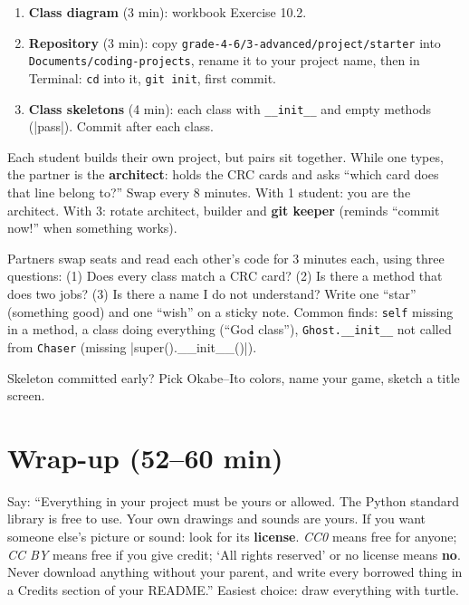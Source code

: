 \begin{enumerate}[itemsep=2pt]
  \item \textbf{Class diagram} (3 min): workbook Exercise 10.2.
  \item \textbf{Repository} (3 min): copy \texttt{grade-4-6/3-advanced/project/starter} into \texttt{Documents/coding-projects}, rename it to your project name, then in Terminal: \texttt{cd} into it, \texttt{git init}, first commit.
  \item \textbf{Class skeletons} (4 min): each class with \texttt{\_\_init\_\_} and empty methods (\py|pass|). Commit after each class.
\end{enumerate}

\begin{pairroles}
Each student builds their own project, but pairs sit together. While one types, the partner is the \textbf{architect}: holds the CRC cards and asks \enquote{which card does that line belong to?} Swap every 8 minutes. With 1 student: you are the architect. With 3: rotate architect, builder and \textbf{git keeper} (reminds \enquote{commit now!} when something works).
\end{pairroles}

\begin{bughunt}
Partners swap seats and read each other's code for 3 minutes each, using three questions: (1) Does every class match a CRC card? (2) Is there a method that does two jobs? (3) Is there a name I do not understand? Write one \enquote{star} (something good) and one \enquote{wish} on a sticky note. Common finds: \texttt{self} missing in a method, a class doing everything (\enquote{God class}), \texttt{Ghost.\_\_init\_\_} not called from \texttt{Chaser} (missing \py|super().__init__()|).
\end{bughunt}

\begin{freebuild}
Skeleton committed early? Pick Okabe--Ito colors, name your game, sketch a title screen.
\end{freebuild}

\section{Wrap-up (52--60 min)}
\begin{safety}
Say: \enquote{Everything in your project must be yours or allowed. The Python standard library is free to use. Your own drawings and sounds are yours. If you want someone else's picture or sound: look for its \textbf{license}. \emph{CC0} means free for anyone; \emph{CC BY} means free if you give credit; \enquote{All rights reserved} or no license means \textbf{no}. Never download anything without your parent, and write every borrowed thing in a Credits section of your README.} Easiest choice: draw everything with turtle.
\end{safety}

